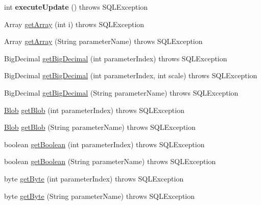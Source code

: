 \begin{DoxyCompactItemize}
int {\bfseries execute\+Update} ()  throws S\+Q\+L\+Exception 
\item 
Array \mbox{\hyperlink{classcom_1_1mysql_1_1cj_1_1jdbc_1_1_callable_statement_abbdda7be3e842e71327e8ea392f7a5ed}{get\+Array}} (int i)  throws S\+Q\+L\+Exception 
\item 
Array \mbox{\hyperlink{classcom_1_1mysql_1_1cj_1_1jdbc_1_1_callable_statement_a188c215d455bd103ff1df71a20edea16}{get\+Array}} (String parameter\+Name)  throws S\+Q\+L\+Exception 
\item 
Big\+Decimal \mbox{\hyperlink{classcom_1_1mysql_1_1cj_1_1jdbc_1_1_callable_statement_a1f198827834b03e1db3d18b47c57c654}{get\+Big\+Decimal}} (int parameter\+Index)  throws S\+Q\+L\+Exception 
\item 
Big\+Decimal \mbox{\hyperlink{classcom_1_1mysql_1_1cj_1_1jdbc_1_1_callable_statement_aa8343c70b7c58a64f062ee4d0fef0981}{get\+Big\+Decimal}} (int parameter\+Index, int scale)  throws S\+Q\+L\+Exception 
\item 
Big\+Decimal \mbox{\hyperlink{classcom_1_1mysql_1_1cj_1_1jdbc_1_1_callable_statement_adc05152dc0cfb8a4dfc6a9d4c6ea989e}{get\+Big\+Decimal}} (String parameter\+Name)  throws S\+Q\+L\+Exception 
\item 
\mbox{\hyperlink{classcom_1_1mysql_1_1cj_1_1jdbc_1_1_blob}{Blob}} \mbox{\hyperlink{classcom_1_1mysql_1_1cj_1_1jdbc_1_1_callable_statement_a8e4c5f767bd7bd21b27fddd12f787f08}{get\+Blob}} (int parameter\+Index)  throws S\+Q\+L\+Exception 
\item 
\mbox{\hyperlink{classcom_1_1mysql_1_1cj_1_1jdbc_1_1_blob}{Blob}} \mbox{\hyperlink{classcom_1_1mysql_1_1cj_1_1jdbc_1_1_callable_statement_a6901a932f5c35457ae1226f67ce97a3b}{get\+Blob}} (String parameter\+Name)  throws S\+Q\+L\+Exception 
\item 
boolean \mbox{\hyperlink{classcom_1_1mysql_1_1cj_1_1jdbc_1_1_callable_statement_a79e721d38feeff854ff4532cc0ca5aae}{get\+Boolean}} (int parameter\+Index)  throws S\+Q\+L\+Exception 
\item 
boolean \mbox{\hyperlink{classcom_1_1mysql_1_1cj_1_1jdbc_1_1_callable_statement_af41b4f682975fed49bfa17b6b2644bc9}{get\+Boolean}} (String parameter\+Name)  throws S\+Q\+L\+Exception 
\item 
byte \mbox{\hyperlink{classcom_1_1mysql_1_1cj_1_1jdbc_1_1_callable_statement_ae89b7a7ccf06cc8ebbb3039730ebc06f}{get\+Byte}} (int parameter\+Index)  throws S\+Q\+L\+Exception 
\item 
byte \mbox{\hyperlink{classcom_1_1mysql_1_1cj_1_1jdbc_1_1_callable_statement_a8969109951dffa5b6a541fcba87f0c40}{get\+Byte}} (String parameter\+Name)  throws S\+Q\+L\+Exception 

\end{DoxyCompactItemize}
